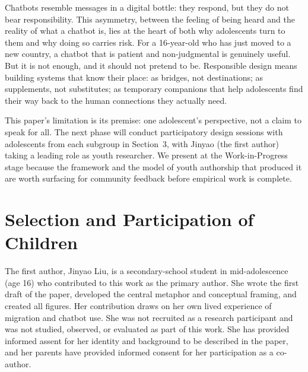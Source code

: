 \documentclass[manuscript]{acmart}
\begin{document}
Chatbots resemble messages in a digital bottle: they respond, but they do not bear
responsibility. This asymmetry, between the feeling of being heard and the reality of what
a chatbot is, lies at the heart of both why adolescents turn to them and why doing so
carries risk. For a 16-year-old who has just moved to a new country, a chatbot that is
patient and non-judgmental is genuinely useful. But it is not enough, and it should not
pretend to be. Responsible design means building systems that know their place: as bridges,
not destinations; as supplements, not substitutes; as temporary companions that help
adolescents find their way back to the human connections they actually need.

This paper's limitation is its premise: one adolescent's perspective, not a claim to speak
for all. The next phase will conduct participatory design sessions with adolescents from each
subgroup in Section~3, with Jinyao (the first author) taking a leading role as youth researcher. We present at
the Work-in-Progress stage because the framework and the model of youth authorship that produced it are
worth surfacing for community feedback before empirical work is complete.


\section{Selection and Participation of Children}

The first author, Jinyao Liu, is a secondary-school student in mid-adolescence (age 16) who
contributed to this work as the primary author. She wrote the first draft of the paper,
developed the central metaphor and conceptual framing, and created all figures. Her
contribution draws on her own lived experience of migration and chatbot use. She was not
recruited as a research participant and was not studied, observed, or evaluated as part of
this work. She has provided informed assent for her identity and background to be described in
the paper, and her parents have provided informed consent for her participation as a
co-author.




\end{document}
